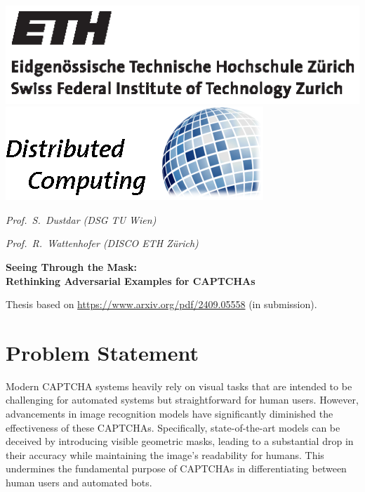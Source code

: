 \documentclass[a4paper,11pt]{article}
\begin{document}
\thispagestyle{empty}

\noindent \hrulefill \vspace{6pt}

\noindent \includegraphics[viewport=8 8 185 55]{figures/eth_logo_black} \hfill
\noindent \includegraphics[trim=0 0 2 0]{figures/disco-logo-col} \hspace{-6pt} \vspace{-6pt}

\noindent \hrulefill \vspace{4pt}

 \hfill {\textit{Prof.\ S.\ Dustdar (DSG TU Wien)}}

\noindent \hfill {\textit{Prof.\ R.\ Wattenhofer (DISCO ETH Zürich)}}

\vspace{2em}

\noindent \textbf{\LARGE Seeing Through the Mask: \\ Rethinking Adversarial Examples for CAPTCHAs} \bigskip

\noindent Thesis based on \url{https://www.arxiv.org/pdf/2409.05558} (in submission).

\section*{Problem Statement}

Modern CAPTCHA systems heavily rely on visual tasks that are intended to be challenging for automated systems but straightforward for human users. However, advancements in image recognition models have significantly diminished the effectiveness of these CAPTCHAs. Specifically, state-of-the-art models can be deceived by introducing visible geometric masks, leading to a substantial drop in their accuracy while maintaining the image's readability for humans. This undermines the fundamental purpose of CAPTCHAs in differentiating between human users and automated bots.
\end{document}
